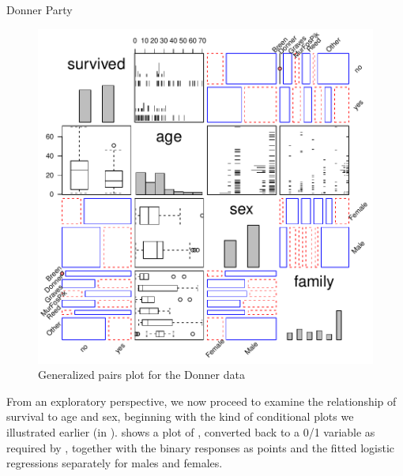 \documentclass[11pt]{book}
\renewenvironment{knitrout}{\small\renewcommand{\baselinestretch}{.85}}{} %
\begin{document}
\begin{Example}[donner1]{Donner Party}
\begin{knitrout}
\begin{figure}[!htbp]
\centerline{\includegraphics[width=.7\textwidth]{ch07/fig/donner1-gpairs} }

\caption[Generalized pairs plot for the Donner data]{Generalized pairs plot for the Donner data\label{fig:donner1-gpairs}}
\end{figure}


\end{knitrout}


From an exploratory perspective,
we now proceed to examine the relationship of survival to age and sex, beginning with the
kind of conditional plots we illustrated earlier (in ).
 shows a plot of , converted back to
a 0/1 variable as required by , together with the binary responses
as points and the fitted logistic regressions separately for males and females.

\begin{knitrout}
\color{fgcolor}\begin{kframe}
\begin{alltt}
  \hlopt{==}\hlstd{),}   \hlopt{+}
  \hlstd{()} \hlopt{+} \hlstd{(}\hlstd{)} \hlopt{+}
  \hlstd{(} \hlstd{=} \hlstd{(} \hlstd{=} \hlstd{,}  \hlstd{=} \hlstd{))} \hlopt{+}
  \hlstd{(} \hlstd{=} \hlstd{,}     \hlopt{~} 
               \hlstd{=} \hlstd{,} \hlstd{=}\hlstd{,} \hlstd{(} 
\end{alltt}
\end{kframe}\begin{figure}[!htbp]



\end{figure}
\end{knitrout}
\end{Example}
\end{document}
